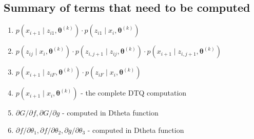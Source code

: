 \documentclass[12pt]{article}
\newcommand{\btheta}{\ensuremath{\boldsymbol{\theta}}}
\begin{document}
\subsection{Summary of terms that need to be computed}
\begin{enumerate}
\item $p(x_{i+1} \mid z_{i1}, \btheta^{(k)}) \cdot p(z_{i1} \mid x_{i}, \btheta^{(k)})$
\item $p(z_{ij} \mid x_i, \btheta^{(k)}) \cdot p(z_{i, j+1} \mid z_{ij}, \btheta^{(k)}) \cdot p(x_{i+1} \mid z_{i,j+1}, \btheta^{(k)})$
\item $p(x_{i+1} \mid z_{iF}, \btheta^{(k)}) \cdot p(z_{iF} \mid x_{i}, \btheta^{(k)})$
\item $p(x_{i+1} \mid x_{i}, \btheta^{(k)})$ - the complete DTQ computation
\item $\partial G/\partial f, \partial G/\partial g$ - computed in Dtheta function
\item $\partial f/\partial \theta_1, \partial f/\partial \theta_2, \partial g/\partial \theta_3$ - computed in Dtheta function
\end{enumerate}
\end{document}
